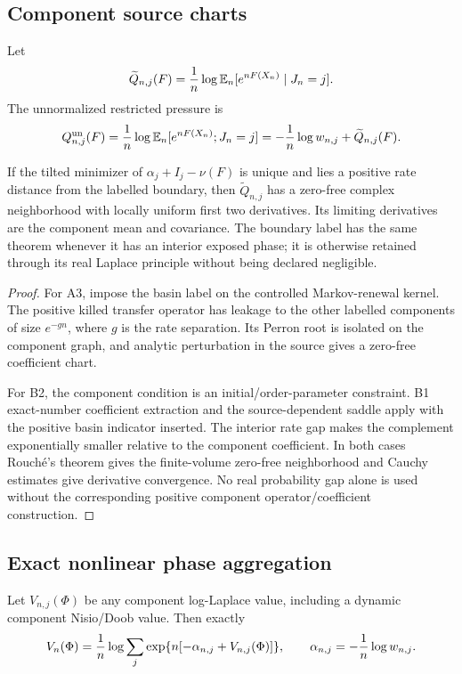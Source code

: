 \subsection{Component source charts}

Let
\[
 \widetilde Q_{n,j}(F)
 ={1\over n}\log
 \mathbb E_n[e^{nF(X_n)}\mid J_n=j].
\]
The unnormalized restricted pressure is
\[
 Q_{n,j}^{\rm un}(F)
 ={1\over n}\log
 \mathbb E_n[e^{nF(X_n)};J_n=j]
 =-{1\over n}\log w_{n,j}+\widetilde Q_{n,j}(F).
\]

\begin{theorem}
\label{thm:r14-d1-chart}
If the tilted minimizer of \(\alpha_j+I_j-\nu(F)\) is unique and lies a
positive rate distance from the labelled boundary, then
\(\widetilde Q_{n,j}\) has a zero-free complex neighborhood with locally
uniform first two derivatives.  Its limiting derivatives are the component
mean and covariance.  The boundary label has the same theorem whenever it
has an interior exposed phase; it is otherwise retained through its real
Laplace principle without being declared negligible.
\end{theorem}

\begin{proof}
For A3, impose the basin label on the controlled Markov-renewal kernel.
The positive killed transfer operator has leakage to the other labelled
components of size \(e^{-gn}\), where \(g\) is the rate separation.  Its
Perron root is isolated on the component graph, and analytic perturbation in
the source gives a zero-free coefficient chart.

For B2, the component condition is an initial/order-parameter constraint.
B1 exact-number coefficient extraction and the source-dependent saddle apply
with the positive basin indicator inserted.  The interior rate gap makes the
complement exponentially smaller relative to the component coefficient.
In both cases Rouch\'e's theorem gives the finite-volume zero-free
neighborhood and Cauchy estimates give derivative convergence.  No real
probability gap alone is used without the corresponding positive component
operator/coefficient construction.
\end{proof}

\subsection{Exact nonlinear phase aggregation}

Let \(V_{n,j}(\Phi)\) be any component log-Laplace value, including a dynamic
component Nisio/Doob value.  Then exactly
\[
 V_n(\Phi)
 ={1\over n}\log
 \sum_j
 \exp\{n[-\alpha_{n,j}+V_{n,j}(\Phi)]\},
 \qquad
 \alpha_{n,j}=-{1\over n}\log w_{n,j}.
\]

